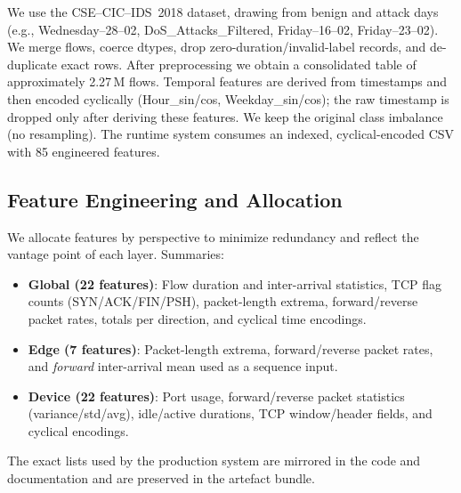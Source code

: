 \documentclass[conference]{IEEEtran}
\begin{document}
We use the CSE--CIC--IDS~2018 dataset, drawing from benign and attack days (e.g., Wednesday--28--02, DoS\_Attacks\_Filtered, Friday--16--02, Friday--23--02). We merge flows, coerce dtypes, drop zero-duration/invalid-label records, and de-duplicate exact rows. After preprocessing we obtain a consolidated table of approximately 2.27\,M flows. Temporal features are derived from timestamps and then encoded cyclically (Hour\_sin/cos, Weekday\_sin/cos); the raw timestamp is dropped only after deriving these features. We keep the original class imbalance (no resampling). The runtime system consumes an indexed, cyclical-encoded CSV with 85 engineered features.

\subsection{Feature Engineering and Allocation}

We allocate features by perspective to minimize redundancy and reflect the vantage point of each layer. Summaries:
\begin{itemize}
    \item \textbf{Global (22 features)}: Flow duration and inter-arrival statistics, TCP flag counts (SYN/ACK/FIN/PSH), packet-length extrema, forward/reverse packet rates, totals per direction, and cyclical time encodings.
    \item \textbf{Edge (7 features)}: Packet-length extrema, forward/reverse packet rates, and \emph{forward} inter-arrival mean used as a sequence input.
    \item \textbf{Device (22 features)}: Port usage, forward/reverse packet statistics (variance/std/avg), idle/active durations, TCP window/header fields, and cyclical encodings.
\end{itemize}
The exact lists used by the production system are mirrored in the code and documentation and are preserved in the artefact bundle.
\end{document}

